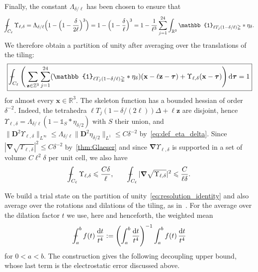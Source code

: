 \documentclass[final,reqno]{amsart}
\theoremstyle{remark}
\renewcommand{\le}{\leqslant}
\newcommand{\RR}{\mathbb{R}}
\newcommand{\ZZ}{\mathbb{Z}}
\newcommand{\iden}{\mathbb{1}}
\newcommand{\grad}{\bm{\nabla}}
\newcommand{\tetra}{\mathbb{\Delta}}
\newcommand{\dd}{\mathrm{d}}
\def\Xint#1{\mathchoice
{\XXint\displaystyle\textstyle{#1}}
{\XXint\textstyle\scriptstyle{#1}}
{\XXint\scriptstyle\scriptscriptstyle{#1}}
{\XXint\scriptscriptstyle\scriptscriptstyle{#1}}
\!\int}
\def\XXint#1#2#3{{\setbox0=\hbox{$#1{#2#3}{\int}$ }
\vcenter{\hbox{$#2#3$ }}\kern-.6\wd0}}
\def\dashint{\Xint-}
\begin{document}
Finally, the constant $\Lambda_{\delta/\ell}$ has been chosen to ensure that
$$
\dashint_{C_\ell}\Upsilon_{\ell,\delta}=\Lambda_{\delta/\ell}\Big(1-\Big(1-\frac{\delta}{2\ell}\Big)^3\Big)=1-\Big(1-\frac\delta\ell\Big)^3=1-\frac{1}{\ell^3}\sum_{j=1}^{24}\int_{\RR^3}\iden_{\ell T_j(1-\delta/\ell)\tetra}\ast\eta_\delta.
$$
We therefore obtain a partition of unity after averaging over the translations of the tiling:
\begin{equation}\label{eq:resolution_identity}
\boxed{\dashint_{C_\ell}\Bigg(\sum_{\mathbf{z}\in\ZZ^3}\sum_{j=1}^{24} (\iden_{\ell T_j(1-\delta/\ell)\tetra}\ast\eta_\delta)(\mathbf{x}-\ell \mathbf{z}-\bm{\tau})+\Upsilon_{\ell,\delta}(\mathbf{x}-\bm{\tau})\Bigg)\,\dd\bm{\tau}=1}
\end{equation}
for almost every $\mathbf{x}\in\RR^3$. The skeleton function has a bounded hessian of order $\delta^{-2}$. Indeed, the tetrahedra $\ell T_j(1-\delta/(2\ell))\tetra+\ell\mathbf{z}$ are disjoint, hence $\Upsilon_{\ell,\delta}=\Lambda_{\delta/\ell}(1-\iden_S\ast\eta_{\delta/2})$ with $S$ their union, and $\|\mathbf{D}^2\Upsilon_{\ell,\delta}\|_{L^\infty}\le\Lambda_{\delta/\ell}\|\mathbf{D}^2\eta_{\delta/2}\|_{L^1}\le C\delta^{-2}$ by~\cref{eq:def_eta_delta}. Since $|\grad\sqrt{\Upsilon_{\ell,\delta}}|^2\le C\delta^{-2}$ by~\cref{thm:Glaeser} and since $\grad\Upsilon_{\ell,\delta}$ is supported in a set of volume $C\ell^2\delta$ per unit cell, we also have
\begin{equation}\label{eq:skeleton_bounds}
\dashint_{C_\ell}\Upsilon_{\ell,\delta}\le\frac{C\delta}{\ell},\qquad \dashint_{C_\ell}|\grad\sqrt{\Upsilon_{\ell,\delta}}|^2\le\frac{C}{\ell\delta}.
\end{equation}

We build a trial state on the partition of unity~\cref{eq:resolution_identity} and also average over the rotations and dilations of the tiling, as in~\cite{lewin2020local}. For the average over the dilation factor $t$ we use, here and henceforth, the weighted mean
$$
\dashint_a^bf(t)\,\frac{\dd t}{t^4}:=\left(\int_a^b\frac{\dd t}{t^4}\right)^{-1}\int_a^bf(t)\,\frac{\dd t}{t^4}
$$
for $0<a<b$. The construction gives the following decoupling upper bound, whose last term is the electrostatic error discussed above.
\end{document}
